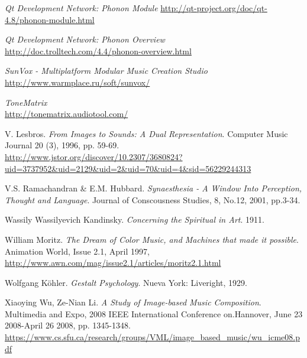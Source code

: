 \begin{thebibliography}{9}
 \emph{Qt Development Network: Phonon Module}
 \url{http://qt-project.org/doc/qt-4.8/phonon-module.html}
 
 \emph{Qt Development Network: Phonon Overview}
 \url{http://doc.trolltech.com/4.4/phonon-overview.html}

\emph{SunVox - Multiplatform Modular Music Creation Studio}\\
\url{http://www.warmplace.ru/soft/sunvox/}

\emph{ToneMatrix}\\
\url{http://tonematrix.audiotool.com/}

 V. Lesbros. \emph{From Images to Sounds: A Dual Representation}. Computer Music Journal 20 (3), 1996, pp. 59-69.\\
 \url{http://www.jstor.org/discover/10.2307/3680824?uid=3737952&uid=2129&uid=2&uid=70&uid=4&sid=56229244313}

  V.S. Ramachandran \& E.M. Hubbard. \emph{Synaesthesia - A Window Into Perception, Thought and Language}. Journal of Conscousness Studies, 8, No.12, 2001, pp.3-34.

 Wassily Wassilyevich Kandinsky. \emph{Concerning the Spiritual in Art}. 1911.

 William Moritz. \emph{The Dream of Color Music, and Machines that made it possible}. Animation World, Issue 2.1, April 1997,\\ 
 \url{http://www.awn.com/mag/issue2.1/articles/moritz2.1.html}

 Wolfgang Köhler. \emph{Gestalt Psychology}. Nueva York: Liveright, 1929.

 Xiaoying Wu, Ze-Nian Li. \emph{A Study of Image-based Music Composition}. Multimedia and Expo, 2008 IEEE International Conference on.Hannover, June 23 2008-April 26 2008, pp. 1345-1348.\\
 \url{https://www.cs.sfu.ca/research/groups/VML/image_based_music/wu_icme08.pdf}
\end{thebibliography}